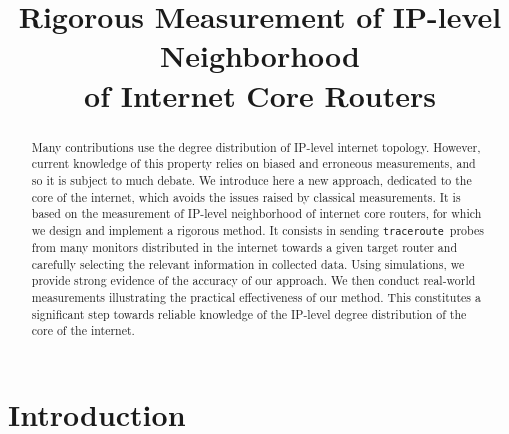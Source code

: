 \documentclass[conference]{IEEEtran}
\newcommand{\traceroute}{{\tt traceroute}}
\begin{document}
\title{
Rigorous Measurement of IP-level Neighborhood\\
\smallskip
of Internet Core Routers
}


\author{
}





\maketitle

\begin{abstract}
Many contributions use the degree distribution
of IP-level internet topology. However, current knowledge
of this property relies on biased and erroneous
measurements, and so it is subject to much debate.
We introduce here a new approach, dedicated to the core of the internet, which avoids the issues 
raised by classical measurements. It is based on the 
measurement of IP-level neighborhood of internet core
routers, for which we design and implement a rigorous 
method. It consists in sending \traceroute\ probes from 
many monitors distributed in the internet towards a 
given target router and carefully selecting the relevant
information in collected data. Using simulations, we provide
strong evidence of the accuracy of our approach. We then conduct 
real-world measurements illustrating the practical 
effectiveness of our method. This constitutes a significant
step towards reliable knowledge of the IP-level
degree distribution of the core of the internet.
\end{abstract}

\section{Introduction}
\label{sec-introduction}
\end{document}
